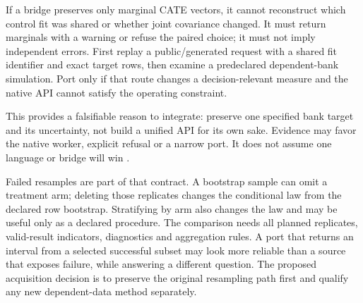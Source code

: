 If a bridge preserves only marginal CATE vectors, it cannot reconstruct which
control fit was shared or whether joint covariance changed. It must return
marginals with a warning or refuse the paired choice; it must not imply
independent errors. First replay a public/generated request with a shared fit
identifier and exact target rows, then examine a predeclared dependent-bank
simulation. Port only if that route changes a decision-relevant measure and the
native API cannot satisfy the operating constraint.

This provides a falsifiable reason to integrate: preserve one specified bank
target and its uncertainty, not build a unified API for its own sake. Evidence
may favor the native worker, explicit refusal or a narrow port. It does not
assume one language or bridge will win \citep{exec17_s9_admission}.

Failed resamples are part of that contract. A bootstrap sample can omit a
treatment arm; deleting those replicates changes the conditional law from
the declared row bootstrap. Stratifying by arm also changes the law and may
be useful only as a declared procedure. The comparison needs all planned
replicates, valid-result indicators, diagnostics and aggregation rules.
A port that returns an interval from a selected successful subset may look
more reliable than a source that exposes failure, while answering a different
question. The proposed acquisition decision is to preserve the original
resampling path first and qualify any new dependent-data method separately.
